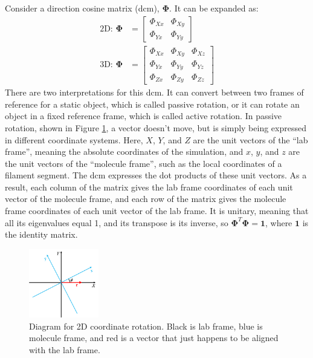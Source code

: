 \documentclass {scrbook}
\begin{document}
Consider a direction cosine matrix (dcm), $\bm{\Phi}$. It can be expanded as:
\begin{align}
\textrm{2D: }\bm{\Phi} &= \left[ \begin{array}{ccc} \Phi_{Xx} & \Phi_{Xy}\\ \Phi_{Yx} & \Phi_{Yy} \end{array} \right]\\
\textrm{3D: }\bm{\Phi} &= \left[ \begin{array}{ccc} \Phi_{Xx} & \Phi_{Xy} & \Phi_{Xz} \\ \Phi_{Yx} & \Phi_{Yy} & \Phi_{Yz} \\ \Phi_{Zx} & \Phi_{Zy} & \Phi_{Zz} \end{array} \right]
\label{eq:DirectionCosineMatrix}
\end{align}
There are two interpretations for this dcm. It can convert between two frames of reference for a static object, which is called passive rotation, or it can rotate an object in a fixed reference frame, which is called active rotation. In passive rotation, shown in Figure \ref{fig:CoordinateRotation}, a vector doesn't move, but is simply being expressed in different coordinate systems. Here, $X$, $Y$, and $Z$ are the unit vectors of the ``lab frame'', meaning the absolute coordinates of the simulation, and $x$, $y$, and $z$ are the unit vectors of the ``molecule frame'', such as the local coordinates of a filament segment. The dcm expresses the dot products of these unit vectors. As a result, each column of the matrix gives the lab frame coordinates of each unit vector of the molecule frame, and each row of the matrix gives the molecule frame coordinates of each unit vector of the lab frame. It is unitary, meaning that all its eigenvalues equal 1, and its transpose is its inverse, so $\bm{\Phi}^T \bm{\Phi} = \bm{1}$, where $\bm{1}$ is the identity matrix.
\begin{figure}[h]
\centering
\includegraphics[height=3cm]{figures/CoordinateRotation.png}
\caption{Diagram for 2D coordinate rotation. Black is lab frame, blue is molecule frame, and red is a vector that just happens to be aligned with the lab frame.}
\label{fig:CoordinateRotation}
\end{figure}
\end{document}
